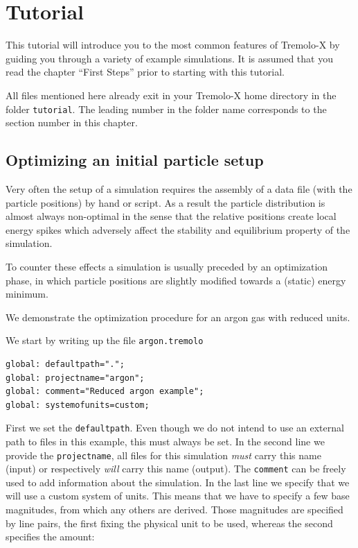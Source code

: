 \chapter{Tutorial}

This tutorial will introduce you to the most common features of Tremolo-X by guiding you through a variety of example simulations.
It is assumed that you read the chapter ``First Steps'' prior to starting with this tutorial.

All files mentioned here already exit in your Tremolo-X home directory in the folder \texttt{tutorial}. The leading number in the folder name corresponds to the section number in this chapter.

\section{Optimizing an initial particle setup}
Very often the setup of a simulation requires the assembly of a data file (with the particle positions) by hand or script.
As a result the particle distribution is almost always non-optimal in the sense that the relative positions create local energy spikes
which adversely affect the stability and equilibrium property of the simulation.

To counter these effects a simulation is usually preceded by an optimization phase, in which particle positions are slightly modified towards a (static) energy minimum.

We demonstrate the optimization procedure for an argon gas with reduced units.

We start by writing up the file \texttt{argon.tremolo}

\begin{lstlisting}
global: defaultpath=".";
global: projectname="argon";
global: comment="Reduced argon example";
global: systemofunits=custom;
\end{lstlisting}

First we set the \texttt{defaultpath}. Even though we do not intend to use an external path to files in this example, this must always be set.
In the second line we provide the \texttt{projectname}, all files for this simulation \textit{must} carry this name (input) or respectively \textit{will} carry this name (output).
The \texttt{comment} can be freely used to add information about the simulation.
In the last line we specify that we will use a custom system of units. This means that we have to specify a few base magnitudes, from which any others are
derived. Those magnitudes are specified by line pairs, the first fixing the physical unit to be used, whereas the second specifies the amount:

